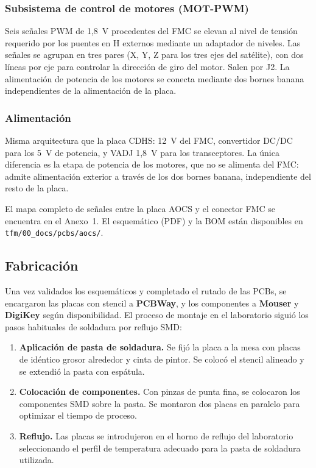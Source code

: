 \subsubsection{Subsistema de control de motores (MOT-PWM)}

Seis señales PWM de 1,8~V procedentes del FMC se elevan al nivel de tensión requerido por
los puentes en H externos mediante un adaptador de niveles. Las señales se agrupan en tres
pares (X, Y, Z para los tres ejes del satélite), con dos líneas por eje para controlar la
dirección de giro del motor. Salen por J2. La alimentación de potencia de los motores se
conecta mediante dos bornes banana independientes de la alimentación de la placa.

\subsubsection{Alimentación}

Misma arquitectura que la placa CDHS: 12~V del FMC, convertidor DC/DC para los 5~V de
potencia, y VADJ 1,8~V para los transceptores. La única diferencia es la etapa de potencia de
los motores, que no se alimenta del FMC: admite alimentación exterior a través de los dos
bornes banana, independiente del resto de la placa.

El mapa completo de señales entre la placa AOCS y el conector FMC se encuentra en el
Anexo~1. El esquemático (PDF) y la BOM están disponibles en \texttt{tfm/00\_docs/pcbs/aocs/}.

\subsection{Fabricación}

Una vez validados los esquemáticos y completado el rutado de las PCBs, se encargaron las
placas con stencil a \textbf{PCBWay}, y los componentes a \textbf{Mouser} y \textbf{DigiKey} según
disponibilidad. El proceso de montaje en el laboratorio siguió los pasos habituales de
soldadura por reflujo SMD:

\begin{enumerate}
    \item \textbf{Aplicación de pasta de soldadura.} Se fijó la placa a la mesa con placas de
    idéntico grosor alrededor y cinta de pintor. Se colocó el stencil alineado y se extendió
    la pasta con espátula.
    \item \textbf{Colocación de componentes.} Con pinzas de punta fina, se colocaron los
    componentes SMD sobre la pasta. Se montaron dos placas en paralelo para optimizar el
    tiempo de proceso.
    \item \textbf{Reflujo.} Las placas se introdujeron en el horno de reflujo del laboratorio
    seleccionando el perfil de temperatura adecuado para la pasta de soldadura utilizada.
\end{enumerate}

